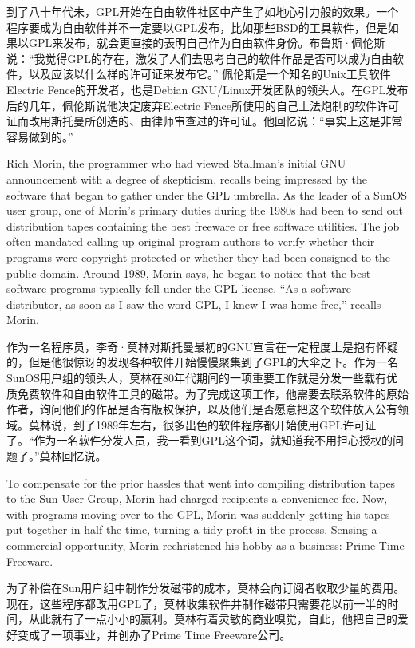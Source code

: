 \ifdefined\chs
到了八十年代未，GPL开始在自由软件社区中产生了如地心引力般的效果。一个程序要成为自由软件并不一定要以GPL发布，比如那些BSD的工具软件，但是如果以GPL来发布，就会更直接的表明自己作为自由软件身份。布鲁斯·佩伦斯说：``我觉得GPL的存在，激发了人们去思考自己的软件作品是否可以成为自由软件，以及应该以什么样的许可证来发布它。'' 佩伦斯是一个知名的Unix工具软件Electric Fence的开发者，也是Debian GNU/Linux开发团队的领头人。在GPL发布后的几年，佩伦斯说他决定废弃Electric Fence所使用的自己土法炮制的软件许可证而改用斯托曼所创造的、由律师审查过的许可证。他回忆说：``事实上这是非常容易做到的。''
\fi

\ifdefined\eng
Rich Morin, the programmer who had viewed Stallman's initial GNU announcement with a degree of skepticism, recalls being impressed by the software that began to gather under the GPL umbrella. As the leader of a SunOS user group, one of Morin's primary duties during the 1980s had been to send out distribution tapes containing the best freeware or free software utilities. The job often mandated calling up original program authors to verify whether their programs were copyright protected or whether they had been consigned to the public domain. Around 1989, Morin says, he began to notice that the best software programs typically fell under the GPL license. ``As a software distributor, as soon as I saw the word GPL, I knew I was home free,'' recalls Morin.
\fi

\ifdefined\chs
作为一名程序员，李奇·莫林对斯托曼最初的GNU宣言在一定程度上是抱有怀疑的，但是他很惊讶的发现各种软件开始慢慢聚集到了GPL的大伞之下。作为一名SunOS用户组的领头人，莫林在80年代期间的一项重要工作就是分发一些载有优质免费软件和自由软件工具的磁带。为了完成这项工作，他需要去联系软件的原始作者，询问他们的作品是否有版权保护，以及他们是否愿意把这个软件放入公有领域。莫林说，到了1989年左右，很多出色的软件程序都开始使用GPL许可证了。``作为一名软件分发人员，我一看到GPL这个词，就知道我不用担心授权的问题了。''莫林回忆说。
\fi

\ifdefined\eng
To compensate for the prior hassles that went into compiling distribution tapes to the Sun User Group, Morin had charged recipients a convenience fee. Now, with programs moving over to the GPL, Morin was suddenly getting his tapes put together in half the time, turning a tidy profit in the process. Sensing a commercial opportunity, Morin rechristened his hobby as a business: Prime Time Freeware.
\fi

\ifdefined\chs
为了补偿在Sun用户组中制作分发磁带的成本，莫林会向订阅者收取少量的费用。现在，这些程序都改用GPL了，莫林收集软件并制作磁带只需要花以前一半的时间，从此就有了一点小小的赢利。莫林有着灵敏的商业嗅觉，自此，他把自己的爱好变成了一项事业，并创办了Prime Time Freeware公司。
\fi

